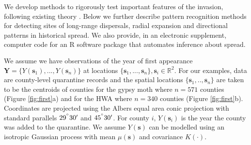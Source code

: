 \documentclass[12pt]{article}
\begin{document}
We develop methods to rigorously test important features of the invasion, following existing theory \citep{banerjee2003directional,banerjee2006bayesian}. Below we further describe pattern recognition methods for detecting sites of long-range dispersals, radial expansion and directional patterns in historical spread. We also provide, in an electronic supplement, computer code for an R \citep{ihaka1996r, rmanual2013} software package that automates inference about spread.

We assume we have observations of the year of first appearance $\bm{Y} = \{ Y(\bm s_1),...,Y(\bm s_n) \}$ at locations $\{ \bm s_1,...,\bm s_n \}, \bm s_i \in \mathbb{R}^2$. For our examples, data are county-level quarantine records and the spatial locations $\{ \bm s_1,..,\bm s_n \}$ are taken to be the centroids of counties for the gypsy moth where $n=571$ counties (Figure \ref{fig:first}a) and for the HWA where $n=340$ counties (Figure \ref{fig:first}b). Coordinates are projected using the Albers equal area conic projection with standard parallels $29^{\degree}30'$ and $45^{\degree}30'$. For county $i$, $Y(\bm s_i)$ is the year the county was added to the quarantine. We assume $Y(\bm s)$ can be modelled using an isotropic Gaussian process with mean $\mu(\bm s)$ and covariance $K(\cdot)$.
\end{document}
